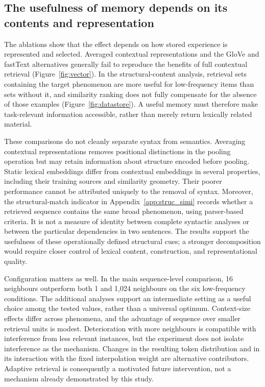 \subsection{The usefulness of memory depends on its contents and representation}

The ablations show that the effect depends on how stored experience is represented and selected. Averaged contextual representations and the GloVe and fastText alternatives generally fail to reproduce the benefits of full contextual retrieval (Figure~\ref{fig:vector}). In the structural-content analysis, retrieval sets containing the target phenomenon are more useful for low-frequency items than sets without it, and similarity ranking does not fully compensate for the absence of those examples (Figure~\ref{fig:datastore}). A useful memory must therefore make task-relevant information accessible, rather than merely return lexically related material.

These comparisons do not cleanly separate syntax from semantics. Averaging contextual representations removes positional distinctions in the pooling operation but may retain information about structure encoded before pooling. Static lexical embeddings differ from contextual embeddings in several properties, including their training sources and similarity geometry. Their poorer performance cannot be attributed uniquely to the removal of syntax. Moreover, the structural-match indicator in Appendix~\ref{app:struc_simi} records whether a retrieved sequence contains the same broad phenomenon, using parser-based criteria. It is not a measure of identity between complete syntactic analyses or between the particular dependencies in two sentences. The results support the usefulness of these operationally defined structural cues; a stronger decomposition would require closer control of lexical content, construction, and representational quality.

Configuration matters as well. In the main sequence-level comparison, 16 neighbours outperform both 1 and 1,024 neighbours on the six low-frequency conditions. The additional analyses support an intermediate setting as a useful choice among the tested values, rather than a universal optimum. Context-size effects differ across phenomena, and the advantage of sequence over smaller retrieval units is modest. Deterioration with more neighbours is compatible with interference from less relevant instances, but the experiment does not isolate interference as the mechanism. Changes in the resulting token distribution and in its interaction with the fixed interpolation weight are alternative contributors. Adaptive retrieval is consequently a motivated future intervention, not a mechanism already demonstrated by this study.

